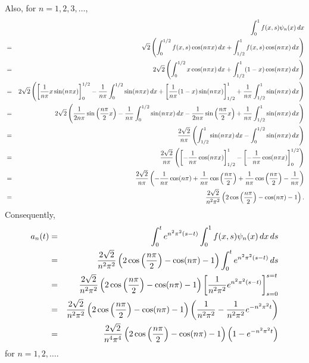 \begin{solution}
\begin{enumerate}
Also, for $n=1,2,3,\ldots$,
\begin{eqnarray*}
&&\int_0^1f(x,s)\psi_n(x)\,dx 
\\
&=& \sqrt{2}\left(\int_0^{1/2} f(x,s)\cos(n\pi x)\,dx+\int_{1/2}^1 f(x,s)\cos(n\pi x)\,dx\right)
\\
&=& 2\sqrt{2}\left(\int_0^{1/2} x\cos(n\pi x)\,dx+\int_{1/2}^1 (1-x)\cos(n\pi x)\,dx\right)
\\
&=&2\sqrt{2}\left(\left[{1 \over n\pi}x\sin(n\pi x)\right]_0^{1/2}-{1 \over n\pi}\int_0^{1/2} \sin(n\pi x)\,dx+\left[{1 \over n\pi}(1-x)\sin(n\pi x)\right]_{1/2}^1+{1 \over n\pi}\int_{1/2}^1 \sin(n\pi x)\,dx\right)
\\
&=&2\sqrt{2}\left({1 \over 2n\pi}\sin\left({n\pi \over 2} x\right)-{1 \over n\pi}\int_0^{1/2} \sin(n\pi x)\,dx-{1 \over 2n\pi}\sin\left({n\pi \over 2} x\right)+{1 \over n\pi}\int_{1/2}^1 \sin(n\pi x)\,dx\right)
\\
&=&{2\sqrt{2} \over n\pi}\left(\int_{1/2}^1 \sin(n\pi x)\,dx-\int_0^{1/2} \sin(n\pi x)\,dx\right)
\\
&=&{2\sqrt{2} \over n\pi}\left(\left[-{1 \over n\pi}\cos(n\pi x)\right]_{1/2}^1-\left[-{1 \over n\pi}\cos(n\pi x)\right]_0^{1/2}\right)
\\
&=&{2\sqrt{2} \over n\pi}\left(-{1 \over n\pi}\cos(n\pi)+{1 \over n\pi}\cos\left({n\pi \over 2}\right)+{1 \over n\pi}\cos\left({n\pi \over 2}\right)-{1 \over n\pi}\right)
\\
&=&{2\sqrt{2} \over n^2\pi^2}\left(2\cos\left({n\pi \over 2}\right)-\cos(n\pi)-1\right).
\end{eqnarray*}
Consequently,
\begin{eqnarray*}
a_n(t)&=&\int_0^te^{n^2\pi^2\left(s-t\right)}\int_0^1f(x,s)\psi_n(x)\,dx\,ds
\\
&=&{2\sqrt{2} \over n^2\pi^2}\left(2\cos\left({n\pi \over 2}\right)-\cos(n\pi)-1\right)\int_0^te^{n^2\pi^2\left(s-t\right)}\,ds
\\
&=&{2\sqrt{2} \over n^2\pi^2}\left(2\cos\left({n\pi \over 2}\right)-\cos(n\pi)-1\right)\left[\frac{1}{n^2\pi^2}e^{n^2\pi^2\left(s-t\right)}\right]_{s=0}^{s=t}
\\
&=&{2\sqrt{2} \over n^2\pi^2}\left(2\cos\left({n\pi \over 2}\right)-\cos(n\pi)-1\right)\left(\frac{1}{n^2\pi^2}-\frac{1}{n^2\pi^2}e^{-n^2\pi^2t}\right)
\\
&=&{2\sqrt{2} \over n^4\pi^4}\left(2\cos\left({n\pi \over 2}\right)-\cos(n\pi)-1\right)\left(1-e^{-n^2\pi^2t}\right)
\end{eqnarray*}
for $n=1,2,\ldots$.


\end{enumerate}
\end{solution}
